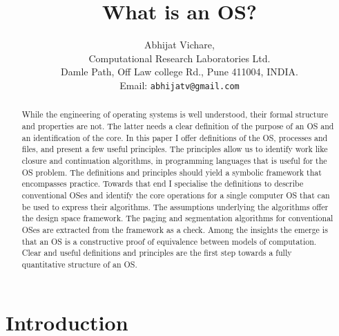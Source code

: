 \documentclass[draft]{article}
\begin{document}
\title{What is an OS?}
\author{Abhijat Vichare,
\\Computational Research Laboratories Ltd.\\Damle Path, Off Law
 college Rd., Pune 411004, INDIA.\\Email: \texttt{abhijatv@gmail.com}}
\maketitle

\begin{abstract}
  While the engineering of operating systems is well understood, their
  formal structure and  properties are not.  The latter  needs a clear
  definition  of the purpose  of an  OS and  an identification  of the
  core.  In  this paper I offer  definitions of the  OS, processes and
  files, and present a few useful principles.  The principles allow us
  to  identify  work  like  closure and  continuation  algorithms,  in
  programming  languages  that is  useful  for  the  OS problem.   The
  definitions and  principles should  yield a symbolic  framework that
  encompasses practice.  Towards that end I specialise the definitions
  to describe conventional OSes and identify the core operations for a
  single computer  OS that  can be used  to express  their algorithms.
  The  assumptions underlying  the algorithms  offer the  design space
  framework.  The paging  and segmentation algorithms for conventional
  OSes  are  extracted from  the  framework  as  a check.   Among  the
  insights  the  emerge is  that  an OS  is  a  constructive proof  of
  equivalence  between  models   of  computation.   Clear  and  useful
  definitions  and  principles are  the  first  step  towards a  fully
  quantitative structure of an OS.
\end{abstract}



\section{Introduction}
\label{sec:introduction}
\end{document}
